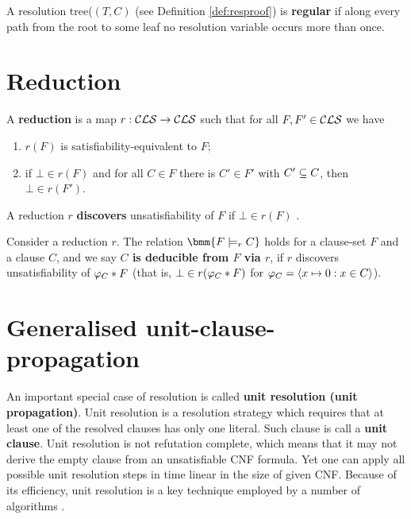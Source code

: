 \documentclass[]{book}
\begin{document}
\begin{defi}\label{def:regres}
  A resolution tree($(T,C)$ (see Definition \ref{def:resproof}) is \textbf{regular} if along every path from the root to some leaf no resolution variable occurs more than once.
\end{defi}
\section{Reduction}
\label{sec:Reduction}
\begin{defi}\label{def:red}
   A \textbf{reduction} is a map $r: \mathcal{CLS} \rightarrow \mathcal{CLS}$ such that for all $F, F' \in \mathcal{CLS}$ we have
  \begin{enumerate}
  \item $r(F)$ is satisfiability-equivalent to $F$;
  \item if $\bot \in r(F)$ and for all $C \in F$ there is $C' \in  F'$ with $C' \subseteq C$, then $\bot \in r(F')$.
  \end{enumerate}
  A reduction $r$ \textbf{discovers} unsatisfiability of $F$ if $\bot \in r(F)$ \cite{h10}.
\end{defi}

\begin{defi}\label{def:implication}
  Consider a reduction $r$. The relation $\bmm{F \models_r C}$ holds for a clause-set $F$ and a clause $C$, and we say \textbf{$C$ is deducible from $F$ via $r$}, if $r$ 
  discovers unsatisfiability of $\varphi_C * F$ (that is, $\bot \in r(\varphi_C * F)$ for $\varphi_C = \langle x \mapsto 0 : x \in C \rangle$).
\end{defi}
\section{Generalised unit-clause-propagation}
\label{sec:rkred}

An important special case of resolution is called \textbf{unit resolution (unit propagation)}. Unit resolution is a resolution strategy 
which requires that at least one of the resolved clauses has only one literal. Such clause is call a \textbf{unit clause}. Unit resolution 
is not refutation complete, which means that it may not derive the empty clause from an unsatisfiable CNF formula. Yet one can apply all 
possible unit resolution steps in time linear in the size of given CNF. Because of its efficiency, unit resolution is a key technique 
employed by a number of algorithms \cite{h6}.
\end{document}

